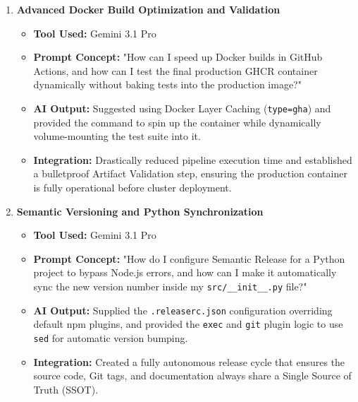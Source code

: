 \documentclass[11pt, a4paper]{article}
\begin{document}
\begin{enumerate}[label=\textbf{Topic \arabic*:}, align=left, leftmargin=0.5cm]
    \item \textbf{Advanced Docker Build Optimization and Validation}
    \begin{itemize}[label={}, leftmargin=0.5cm]
        \item \textbf{Tool Used:} Gemini 3.1 Pro
        \item \textbf{Prompt Concept:} "How can I speed up Docker builds in GitHub Actions, and how can I test the final production GHCR container dynamically without baking tests into the production image?"
        \item \textbf{AI Output:} Suggested using Docker Layer Caching (\texttt{type=gha}) and provided the command to spin up the container while dynamically volume-mounting the test suite into it.
        \item \textbf{Integration:} Drastically reduced pipeline execution time and established a bulletproof Artifact Validation step, ensuring the production container is fully operational before cluster deployment.
    \end{itemize}
    \vspace{0.3cm}

    \item \textbf{Semantic Versioning and Python Synchronization}
    \begin{itemize}[label={}, leftmargin=0.5cm]
        \item \textbf{Tool Used:} Gemini 3.1 Pro
        \item \textbf{Prompt Concept:} "How do I configure Semantic Release for a Python project to bypass Node.js errors, and how can I make it automatically sync the new version number inside my \texttt{src/\_\_init\_\_.py} file?"
        \item \textbf{AI Output:} Supplied the \texttt{.releaserc.json} configuration overriding default npm plugins, and provided the \texttt{exec} and \texttt{git} plugin logic to use \texttt{sed} for automatic version bumping.
        \item \textbf{Integration:} Created a fully autonomous release cycle that ensures the source code, Git tags, and documentation always share a Single Source of Truth (SSOT).
    \end{itemize}
    \vspace{0.3cm}


\end{enumerate}
\end{document}
